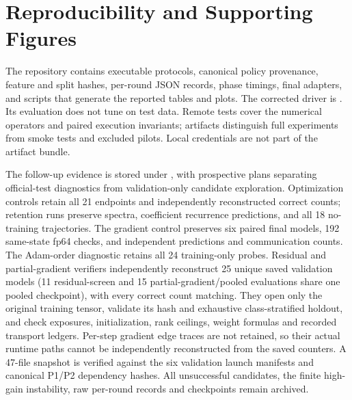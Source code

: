 \documentclass[11pt]{article}
\begin{document}
\appendix
\section{Reproducibility and Supporting Figures}
The repository contains executable protocols, canonical policy provenance, feature and split hashes, per-round JSON records, phase timings, final adapters, and scripts that generate the reported tables and plots. The corrected driver is . Its evaluation does not tune on test data. Remote tests cover the numerical operators and paired execution invariants; artifacts distinguish full experiments from smoke tests and excluded pilots. Local credentials are not part of the artifact bundle.

The follow-up evidence is stored under , with prospective plans separating official-test diagnostics from validation-only candidate exploration. Optimization controls retain all 21 endpoints and independently reconstructed correct counts; retention runs preserve spectra, coefficient recurrence predictions, and all 18 no-training trajectories. The gradient control preserves six paired final models, 192 same-state fp64 checks, and independent predictions and communication counts. The Adam-order diagnostic retains all 24 training-only probes. Residual and partial-gradient verifiers independently reconstruct 25 unique saved validation models (11 residual-screen and 15 partial-gradient/pooled evaluations share one pooled checkpoint), with every correct count matching. They open only the original training tensor, validate its hash and exhaustive class-stratified holdout, and check exposures, initialization, rank ceilings, weight formulas and recorded transport ledgers. Per-step gradient edge traces are not retained, so their actual runtime paths cannot be independently reconstructed from the saved counters. A 47-file snapshot is verified against the six validation launch manifests and canonical P1/P2 dependency hashes. All unsuccessful candidates, the finite high-gain instability, raw per-round records and checkpoints remain archived.
\end{document}
